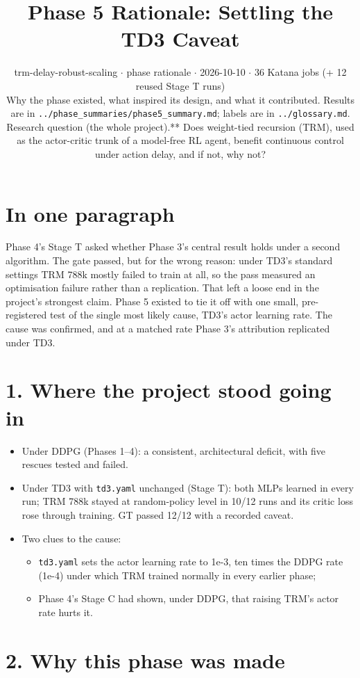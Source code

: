 \documentclass[11pt]{article}
\title{Phase 5 Rationale: Settling the TD3 Caveat}
\author{}
\date{trm-delay-robust-scaling $\cdot$ phase rationale $\cdot$ 2026-10-10 $\cdot$ 36 Katana jobs (+ 12 reused Stage T runs)\\[2pt]Why the phase existed, what inspired its design, and what it contributed. Results are in \texttt{.\allowbreak{}.\allowbreak{}/\allowbreak{}phase\_\allowbreak{}summaries/\allowbreak{}phase5\_\allowbreak{}summary.\allowbreak{}md}; labels are in \texttt{.\allowbreak{}.\allowbreak{}/\allowbreak{}glossary.\allowbreak{}md}.\\[2pt]Research question (the whole project).** Does weight-tied recursion (TRM), used as the actor-critic trunk of a model-free RL agent, benefit continuous control under action delay, and if not, why not?}
\begin{document}
\maketitle
\section*{In one paragraph}



Phase 4's Stage T asked whether Phase 3's central result holds under a second algorithm. The gate passed, but for the wrong reason: under TD3's standard settings TRM 788k mostly failed to train at all, so the pass measured an optimisation failure rather than a replication. That left a loose end in the project's strongest claim. Phase 5 existed to tie it off with one small, pre-registered test of the single most likely cause, TD3's actor learning rate. The cause was confirmed, and at a matched rate Phase 3's attribution replicated under TD3.



\section*{1. Where the project stood going in}



\begin{itemize}
\item Under DDPG (Phases 1--4): a consistent, architectural deficit, with five rescues tested and failed.
\item Under TD3 with \texttt{td3.yaml} unchanged (Stage T): both MLPs learned in every run; TRM 788k stayed at random-policy level in 10/12 runs and its critic loss rose through training. GT passed 12/12 with a recorded caveat.
\item Two clues to the cause:
\begin{itemize}
\item \texttt{td3.yaml} sets the actor learning rate to 1e-3, ten times the DDPG rate (1e-4) under which TRM trained normally in every earlier phase;
\item Phase 4's Stage C had shown, under DDPG, that raising TRM's actor rate hurts it.
\end{itemize}
\end{itemize}



\section*{2. Why this phase was made}
\end{document}
